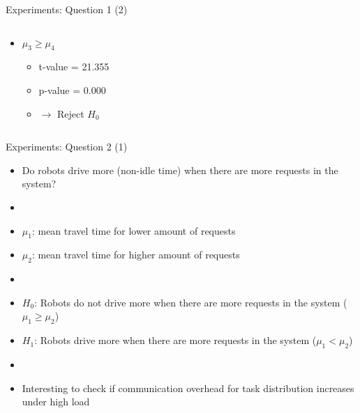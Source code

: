 \begin{frame}{Experiments: Question 1 (2)}
\begin{columns}
\begin{column}{0.5\textwidth}
\begin{itemize}
                \item $\mu_3 \geq \mu_4$
                    \begin{itemize}
                        \item t-value = 21.355
                        \item p-value = 0.000
                        \item $\rightarrow$ Reject $H_0$
                    \end{itemize}
            \end{itemize}
        \end{column}

    \end{columns}
\end{frame}



\begin{frame}{Experiments: Question 2 (1)}
    \begin{itemize}
        \item Do robots drive more (non-idle time) when there are more requests in the system?
        \item[]
        \item $\mu_1$: mean travel time for lower amount of requests
        \item $\mu_2$: mean travel time for higher amount of requests
        \item[]
        \item $H_0$: Robots do not drive more when there are more requests in the system ($\mu_1 \geq \mu_2$)
        \item $H_1$: Robots drive more when there are more requests in the system        ($\mu_1 < \mu_2$)
        \item[]
        \item Interesting to check if communication overhead for task distribution increases under high load
    \end{itemize}
\end{frame}

